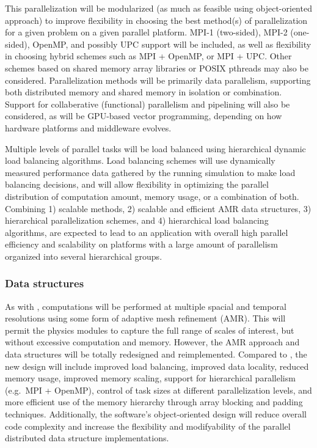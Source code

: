 \documentclass[11pt]{article}
\begin{document}
    This parallelization will be modularized (as much as feasible
    using object-oriented approach) to improve flexibility in choosing
    the best method(s) of parallelization for a given problem on a
    given parallel platform.  MPI-1 (two-sided), MPI-2 (one-sided),
    OpenMP, and possibly UPC support will be included, as well as
    flexibility in choosing hybrid schemes such as MPI + OpenMP, or
    MPI + UPC.  Other schemes based on shared memory array libraries
    or POSIX pthreads may also be considered.  Parallelization methods
    will be primarily data parallelism, supporting both distributed
    memory and shared memory in isolation or combination.  Support for
    collaberative (functional) parallelism and pipelining will also be
    considered, as will be GPU-based vector programming, depending
    on how hardware platforms and middleware evolves.


    Multiple levels of parallel tasks will be load balanced using
    hierarchical dynamic load balancing algorithms.  Load balancing
    schemes will use dynamically measured performance data gathered by
    the running simulation to make load balancing decisions, and will
    allow flexibility in optimizing the parallel distribution of
    computation amount, memory usage, or a combination of both.  Combining
    1) scalable methods, 2) scalable and efficient AMR data
    structures, 3) hierarchical parallelization schemes, and 4)
    hierarchical load balancing algorithms, are expected to lead to an
    application with overall high parallel efficiency and scalability
    on platforms with a large amount of parallelism organized into
    several hierarchical groups.


    \subsubsection{Data structures}

    As with \enzo, computations will be performed at multiple spacial
    and temporal resolutions using some form of adaptive mesh
    refinement (AMR).  This will permit the physics modules to capture
    the full range of scales of interest, but without excessive
    computation and memory.  However, the AMR approach and
    data structures will be totally redesigned and reimplemented.
    Compared to \enzo, the new design will include improved load
    balancing, improved data locality, reduced memory usage, improved
    memory scaling, support for hierarchical parallelism (e.g.~MPI +
    OpenMP), control of task sizes at different parallelization
    levels, and more efficient use of the memory hierarchy through
    array blocking and padding techniques.  Additionally, the
    software's object-oriented design will reduce overall code
    complexity and increase the flexibility and modifyability of the
    parallel distributed data structure implementations.
\end{document}
